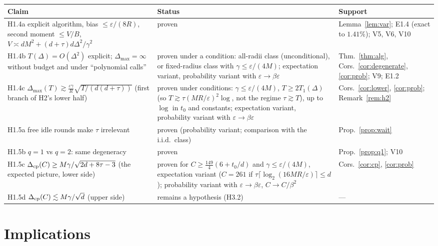 \documentclass[11pt,a4paper]{article}
\numberwithin{equation}{section}
\theoremstyle{definition}
\theoremstyle{remark}
\newcommand{\Dmax}{\Delta_{\max}}\newcommand{\Dcp}{\Delta_{\rm cp}}
\begin{document}
\begin{center}\small
\begin{tabularx}{\textwidth}{@{}p{5.2cm}p{3.0cm}X@{}}
\toprule
\textbf{Claim} & \textbf{Status} & \textbf{Support}\\\midrule
H1.4a explicit algorithm, bias $\le\varepsilon/(8R)$, second moment $\le V/B$, $V\asymp dM^2+(d+\tau)d\Delta^2/\gamma^2$ & proven & Lemma~\ref{lem:var}; E1.4 (exact to $1.41\%$); V5, V6, V10 \\
H1.4b $T(\Delta)=O(\Delta^2)$ explicit; $\Dmax=\infty$ without budget and under ``polynomial calls'' & proven under a condition: all-radii class (unconditional), or fixed-radius class with $\gamma\le\varepsilon/(4M)$; expectation variant, probability variant with $\varepsilon\to\beta\varepsilon$ & Thm.~\ref{thm:alg}, Cors.~\ref{cor:degenerate}, \ref{cor:prob}; V9; E1.2 \\
H1.4c $\Dmax(T)\gtrsim\frac{\varepsilon\gamma}R\sqrt{T/(d(d+\tau))}$ (first branch of H2's lower half) & proven under conditions: $\gamma\le\varepsilon/(4M)$, $T\ge2T_1(\Delta)$ (so $T\gtrsim\tau(MR/\varepsilon)^2\log$, not the regime $\tau\gtrsim T$), up to $\log$ in $t_0$ and constants; expectation variant, probability variant with $\varepsilon\to\beta\varepsilon$ & Cors.~\ref{cor:lower}, \ref{cor:prob}; Remark~\ref{rem:h2} \\
H1.5a free idle rounds make $\tau$ irrelevant & proven (probability variant; comparison with the i.i.d.\ class) & Prop.~\ref{prop:wait} \\
H1.5b $q=1$ vs $q=2$: same degeneracy & proven & Prop.~\ref{prop:q1}; V10 \\
H1.5c $\Dcp(C)\ge M\gamma/\sqrt{2d+8\tau-3}$ (the expected picture, lower side) & proven for $C\ge\frac{149}4(6+t_0/d)$ and $\gamma\le\varepsilon/(4M)$, expectation variant ($C=261$ if $\tau\lceil\log_2(16MR/\varepsilon)\rceil\le d$); probability variant with $\varepsilon\to\beta\varepsilon$, $C\to C/\beta^2$ & Cors.~\ref{cor:cp}, \ref{cor:prob} \\
H1.5d $\Dcp(C)\lesssim M\gamma/\sqrt d$ (upper side) & remains a hypothesis (H3.2) & --- \\
\bottomrule
\end{tabularx}
\end{center}

\section{Implications}\label{sec:contrib}
\end{document}

